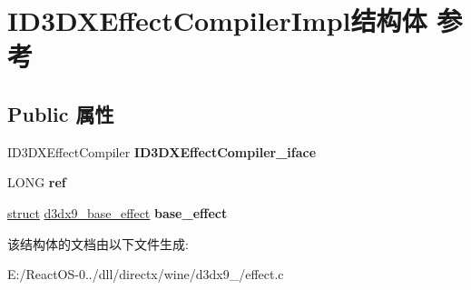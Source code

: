 \hypertarget{struct_i_d3_d_x_effect_compiler_impl}{}\section{I\+D3\+D\+X\+Effect\+Compiler\+Impl结构体 参考}
\label{struct_i_d3_d_x_effect_compiler_impl}
\subsection*{Public 属性}
\begin{DoxyCompactItemize}
\item 
\mbox{\label{struct_i_d3_d_x_effect_compiler_impl_a13df0e193bf9497024eb1f11a659d97a}} 
I\+D3\+D\+X\+Effect\+Compiler {\bfseries I\+D3\+D\+X\+Effect\+Compiler\+\_\+iface}
\item 
\mbox{\label{struct_i_d3_d_x_effect_compiler_impl_ac80095adc74677557dda162fa265d9fa}} 
L\+O\+NG {\bfseries ref}
\item 
\mbox{\label{struct_i_d3_d_x_effect_compiler_impl_ac279f807d44d21be5a9cc021cbd3d5ca}} 
\hyperlink{interfacestruct}{struct} \hyperlink{structd3dx9__base__effect}{d3dx9\+\_\+base\+\_\+effect} {\bfseries base\+\_\+effect}
\end{DoxyCompactItemize}


该结构体的文档由以下文件生成\+:\begin{DoxyCompactItemize}
\item 
E\+:/\+React\+O\+S-\/0../dll/directx/wine/d3dx9\+\_/effect.\+c\end{DoxyCompactItemize}
